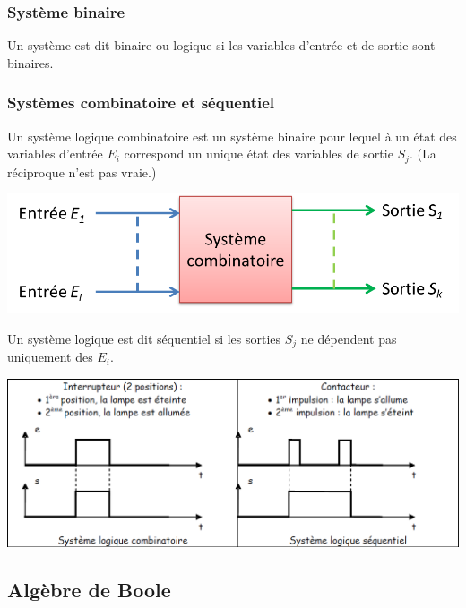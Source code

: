 \documentclass[10pt]{article}
\begin{document}
\subsubsection{Système binaire}

\begin{defi}
Un système est dit binaire ou logique si les variables d'entrée et de sortie sont binaires. 
\end{defi}

\subsubsection{Systèmes combinatoire et séquentiel}
\begin{defi}
Un système logique combinatoire est un système binaire pour lequel à un état des variables d'entrée $E_i$ correspond un unique état des variables de sortie $S_j$. (La réciproque n'est pas vraie.)
\end{defi}

\begin{center}
\includegraphics[width=.6\textwidth]{images/fig_08}
\end{center}

\begin{defi}
Un système logique est dit séquentiel si les sorties $S_j$ ne dépendent pas uniquement des $E_i$.
\end{defi}

\begin{exemple}
\begin{center}
\includegraphics[width=.9\textwidth]{images/fig_09}
\end{center}

\end{exemple}


\subsection{Algèbre de Boole}
\end{document}
